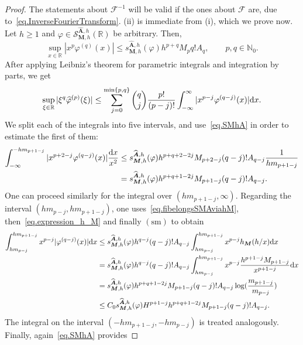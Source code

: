 \documentclass[12pt,a4paper]{article}
\newcommand{\N}{\mathbb{N}}
\newcommand{\R}{\mathbb{R}}
\newcommand{\M}{{\boldsymbol{M}}}
\newcommand{\hA}{\widehat{{\boldsymbol{A}}}}
\newcommand{\dx}{{\rm d}x }
\newcommand{\sm}{\operatorname{(sm)}}
\theoremstyle{plain}
\theoremstyle{definition}
\numberwithin{equation}{section}
\begin{document}
\begin{proof}
The statements about $\mathcal{F}^{-1}$ will be valid if the ones about $\mathcal{F}$ are, due to~\eqref{eq.InverseFourierTransform}.
(ii) is immediate from (i), which we prove now. Let $h \geq 1$ and $\varphi \in \mathcal{S}_{\M,h}^{\hA,h}(\R)$ be arbitrary. Then,
\begin{equation}\label{eq.SMhA}
\sup_{x \in \R} |x^p\varphi^{(q)}(x)| \leq s_{\M,h}^{\hA,h}(\varphi)h^{p+q}M_pq!A_q, \qquad p,q \in \N_0.
\end{equation}
After applying Leibniz's theorem for parametric integrals and integration by parts, we get
\begin{equation}\label{eq.estimate-Fourier-first}
\sup_{\xi \in \R} |\xi^q\widehat{\varphi}^{(p)}(\xi)| \leq \sum_{j=0}^{\min\{p,q\}} \binom{q}{j} \frac{p!}{(p-j)!} \int_{-\infty}^\infty |x^{p-j} \varphi^{(q-j)}(x)| \dx.
\end{equation}
We split each of the integrals into five intervals, and use~\eqref{eq.SMhA} in order to estimate the first of them:
\begin{align}
\int_{-\infty}^{-hm_{p+1-j}} |x^{p+2-j} \varphi^{(q-j)}(x)|\frac{\dx}{x^2}&\le
s_{\M,h}^{\hA,h}(\varphi)h^{p+q+2-2j}M_{p+2-j}(q-j)!A_{q-j} \frac{1}{hm_{p+1-j}}\nonumber\\
&=s_{\M,h}^{\hA,h}(\varphi)h^{p+q+1-2j}M_{p+1-j}(q-j)!A_{q-j}.\label{eq.estimate-Fourier-extreme-intervals}
\end{align}
One can proceed similarly for the integral over $(hm_{p+1-j},\infty)$. Regarding the interval $(hm_{p-j},hm_{p+1-j})$, one uses~\eqref{eq.fibelongsSMAviahM}, then~\eqref{eq.expression_h_M} and finally $\sm$ to obtain
\begin{align}
\int_{hm_{p-j}}^{hm_{p+1-j}} x^{p-j} |\varphi^{(q-j)}(x)|\dx &\le
s_{\M,h}^{\hA,h}(\varphi)h^{q-j}(q-j)!A_{q-j} \int_{hm_{p-j}}^{hm_{p+1-j}}x^{p-j} h_{\M}(h/x)\dx\nonumber\\
&=
s_{\M,h}^{\hA,h}(\varphi)h^{q-j}(q-j)!A_{q-j} \int_{hm_{p-j}}^{hm_{p+1-j}}x^{p-j} \frac{h^{p+1-j}M_{p+1-j}}{x^{p+1-j}}\dx\nonumber\\
&=
s_{\M,h}^{\hA,h}(\varphi)h^{p+q+1-2j}M_{p+1-j}(q-j)!A_{q-j} \log(\frac{m_{p+1-j}}{m_{p-j}})\nonumber\\
&\le C_0s_{\M,h}^{\hA,h}(\varphi)H^{p+1-j}h^{p+q+1-2j}M_{p+1-j}(q-j)!A_{q-j}.
\label{eq.estimate-Fourier-middle-intervals}
\end{align}
The integral on the interval $(-hm_{p+1-j},-hm_{p-j})$ is treated analogously. Finally, again~\eqref{eq.SMhA} provides

\end{proof}
\end{document}

